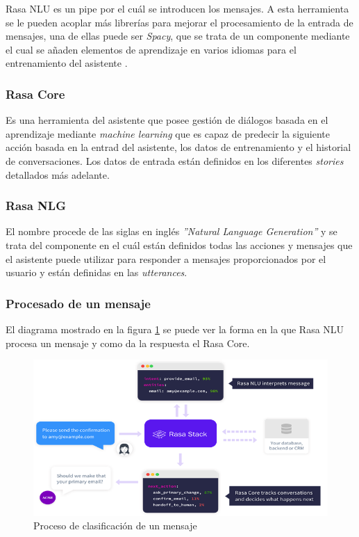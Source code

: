 Rasa NLU es un pipe por el cuál se introducen los mensajes. A esta herramienta se le pueden acoplar más librerías para mejorar el procesamiento de la entrada de mensajes, una de ellas puede ser \textit{Spacy}, que se trata de un componente mediante el cual se añaden elementos de aprendizaje en varios idiomas para el entrenamiento del asistente \cite{spacy}.

\subsubsection{Rasa Core}
Es una herramienta del asistente que posee gestión de diálogos basada en el aprendizaje mediante \textit{machine learning} que  es capaz de predecir la siguiente acción basada en la entrad del asistente, los datos de entrenamiento y el historial de conversaciones. Los datos de entrada están definidos en los diferentes \textit{stories} detallados más adelante.

\subsubsection{Rasa NLG}
El nombre procede de las siglas en inglés \textit{''Natural Language Generation''} y se trata del componente en el cuál están definidos todas las acciones y mensajes que el asistente puede utilizar para responder a mensajes proporcionados por el usuario y están definidas en las \textit{utterances}.

\subsubsection{Procesado de un mensaje}
El diagrama mostrado en la figura \ref{fig:rasa_flowchart} se puede ver la forma en la que Rasa NLU procesa un mensaje y como da la respuesta el Rasa Core.

\begin{figure}[H]
    \centering
    \includegraphics[width=\textwidth]{include/capturas/rasaFlowchart.png}
    \caption{Proceso de clasificación de un mensaje}
    \label{fig:rasa_flowchart}
\end{figure}

